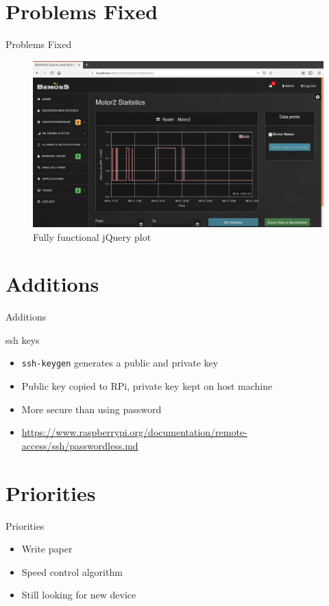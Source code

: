 \documentclass{beamer}
\begin{document}
\section{Problems Fixed}
\begin{frame}{Problems Fixed}{}
\begin{figure}
\includegraphics[scale=0.25]{../figs/motorchart.png}
\caption{Fully functional jQuery plot}
\end{figure}
\end{frame}

\section{Additions}
\begin{frame}{Additions}{}
\begin{block}{ssh keys}
\begin{itemize}
\item \texttt{ssh-keygen} generates a public and private key
\item Public key copied to RPi, private key kept on host machine
\item More secure than using password
\item \url{https://www.raspberrypi.org/documentation/remote-access/ssh/passwordless.md}
\end{itemize}
\end{block}
\end{frame}

\section{Priorities}
\begin{frame}{Priorities}{}
\begin{itemize}
\item Write paper
\item Speed control algorithm
\item Still looking for new device
\end{itemize}
\end{frame}
\end{document}
